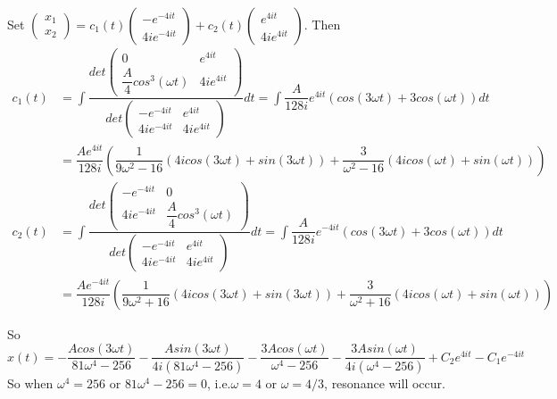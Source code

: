 \documentclass[a4paper,12pt,titlepage]{article}
\begin{document}
Set $\begin{pmatrix}
x_1\\
x_2
\end{pmatrix}=c_1(t)\begin{pmatrix}
-e^{-4it}\\
4ie^{-4it}
\end{pmatrix}+c_2(t)\begin{pmatrix}
e^{4it}\\
4ie^{4it}
\end{pmatrix}$. Then 
\begin{align*}
c_1(t)&=\int\dfrac{det\begin{pmatrix}
0&e^{4it}\\
\dfrac{A}{4}cos^3(\omega t)&4ie^{4it}
\end{pmatrix}}{det\begin{pmatrix}
-e^{-4it}&e^{4it}\\
4ie^{-4it}&4ie^{4it}
\end{pmatrix}}dt=\int \dfrac{A}{128i}e^{4it}(cos(3\omega t)+3cos(\omega t))dt\\
&=\dfrac{Ae^{4it}}{128i}(\dfrac{1}{9\omega^2-16}(4icos(3\omega t)+sin(3\omega t))+\dfrac{3}{\omega^2-16}(4icos(\omega t)+sin(\omega t)))
\end{align*}
\begin{align*}
c_2(t)&=\int\dfrac{det\begin{pmatrix}
-e^{-4it}&0\\
4ie^{-4it}&\dfrac{A}{4}cos^3(\omega t)
\end{pmatrix}}{det\begin{pmatrix}
-e^{-4it}&e^{4it}\\
4ie^{-4it}&4ie^{4it}
\end{pmatrix}}dt=\int \dfrac{A}{128i}e^{-4it}(cos(3\omega t)+3cos(\omega t))dt\\
&=\dfrac{Ae^{-4it}}{128i}(\dfrac{1}{9\omega^2+16}(4icos(3\omega t)+sin(3\omega t))+\dfrac{3}{\omega^2+16}(4icos(\omega t)+sin(\omega t)))
\end{align*}

So
$$
x(t)=-\dfrac{Acos(3\omega t)}{81\omega^4-256}-\dfrac{Asin(3\omega t)}{4i(81\omega^4-256)}-\dfrac{3Acos(\omega t)}{\omega^4-256}-\dfrac{3Asin(\omega t)}{4i(\omega^4-256)}+C_2e^{4it}-C_1e^{-4it}
$$
So when $\omega^4=256$ or $81\omega^4-256=0$, i.e.$\omega=4$ or $\omega=4/3$, resonance will occur.
\end{document}
